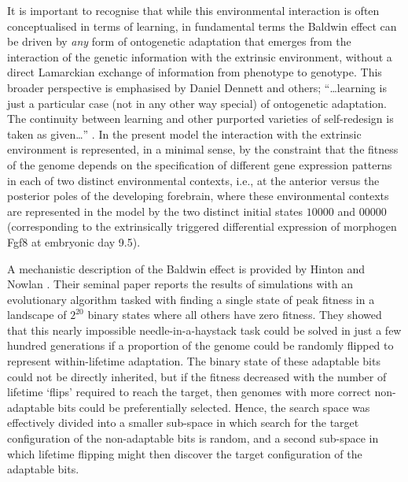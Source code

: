 \documentclass[10pt,letterpaper]{article}
\begin{document}


It is important to recognise that while this environmental interaction is often conceptualised in terms of learning, in fundamental terms the Baldwin effect can be driven by \emph{any} form of ontogenetic adaptation that emerges from the interaction of the genetic information with the extrinsic environment, without a direct Lamarckian exchange of information from phenotype to genotype. This broader perspective is emphasised by Daniel Dennett and others; ``\ldots learning is just a particular case (not in any other way special) of ontogenetic adaptation. The continuity between learning and other purported varieties of self-redesign is taken as given\ldots'' \cite{Dennett2003}. In the present model the interaction with the extrinsic environment is represented, in a minimal sense, by the constraint that the fitness of the genome depends on the specification of different gene expression patterns in each of two distinct environmental contexts, i.e., at the anterior versus the posterior poles of the developing forebrain, where these environmental contexts are represented in the model by the two distinct initial states $10000$ and $00000$ (corresponding to the extrinsically triggered differential expression of morphogen Fgf8 at embryonic day 9.5).

A mechanistic description of the Baldwin effect is provided by Hinton and Nowlan \cite{Hinton1987}. Their seminal paper reports the results of simulations with an evolutionary algorithm tasked with finding a single state of peak fitness in a landscape of $2^{20}$ binary states where all others have zero fitness. They showed that this nearly impossible needle-in-a-haystack task could be solved in just a few hundred generations if a proportion of the genome could be randomly flipped to represent within-lifetime adaptation. The binary state of these adaptable bits could not be directly inherited, but if the fitness decreased with the number of lifetime `flips' required to reach the target, then genomes with more correct non-adaptable bits could be preferentially selected. Hence, the search space was effectively divided into a smaller sub-space in which search for the target configuration of the non-adaptable bits is random, and a second sub-space in which lifetime flipping might then discover the target configuration of the adaptable bits.
\end{document}
